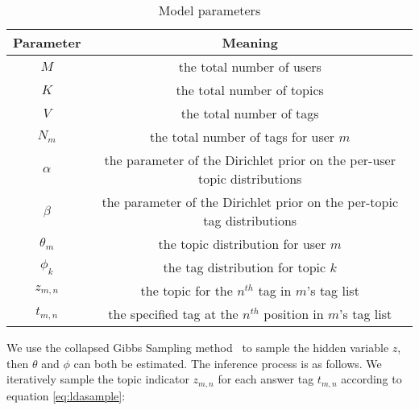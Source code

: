 
\begin{table}[htbp]
\caption{Model parameters}
\label{tab:parameters}
\centering
\begin{tabular}{|c|c|}
\hline
Parameter & Meaning \\
\hline
$M$ & the total number of users\\
\hline
$K$ & the total number of topics\\
\hline
$V$ & the total number of tags\\
\hline
$N_m$ & the total number of tags for user $m$\\
\hline
$\alpha$ & the parameter of the Dirichlet prior on the per-user topic distributions \\
\hline
$\beta$ & the parameter of the Dirichlet prior on the per-topic tag distributions  \\
\hline
$\theta_m$ & the topic distribution for user $m$ \\
\hline
$\phi_k$ & the tag distribution for topic $k$ \\
\hline
$z_{m,n}$ & the topic for the $n^{th}$ tag in $m$'s tag list \\
\hline
$t_{m,n}$ & the specified tag at the $n^{th}$ position in $m$'s tag list\\
\hline

\end{tabular}
\end{table}

We use the collapsed Gibbs Sampling method~\cite{griffiths2004finding} to sample the hidden variable $z$, then $\theta$ and $\phi$ can both be estimated.
The inference process is as follows.
We iteratively sample the topic indicator $z_{m,n}$ for each answer tag $t_{m,n}$ according to equation \ref{eq:ldasample}:

